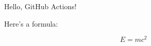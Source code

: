 \documentclass{article}
\begin{document}
Hello, GitHub Actions!

Here's a formula:

\[
E = mc^2
\]
\end{document}
